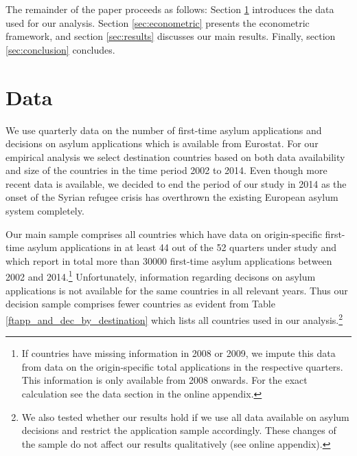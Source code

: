 \documentclass[a4paper,12pt]{article}
\begin{document}

The remainder of the paper proceeds as follows: Section \ref{sec:data} introduces the data used for our analysis. Section \ref{sec:econometric} presents the econometric framework, and section \ref{sec:results} discusses our main results. Finally, section \ref{sec:conclusion} concludes.

\section{Data} \label{sec:data}

We use quarterly data on the number of first-time asylum applications and decisions on asylum applications which is available from Eurostat. For our empirical analysis we select destination countries based on both data availability and size of the countries in the time period 2002 to 2014. Even though more recent data is available, we decided to end the period of our study in 2014 as the onset of the Syrian refugee crisis has overthrown the existing European asylum system completely.  

Our main sample comprises all countries which have data on origin-specific first-time asylum applications in at least 44 out of the 52 quarters under study and which report in total more than 30000 first-time asylum applications between 2002 and 2014.\footnote{If countries have missing information in 2008 or 2009, we impute this data from data on the origin-specific total applications in the respective quarters. This information is only available from 2008 onwards. For the exact calculation see the data section in the online appendix.} Unfortunately, information regarding decisons on asylum applications is not available for the same countries in all relevant years. Thus our decision sample comprises fewer countries as evident from Table \ref{ftapp_and_dec_by_destination} which lists all countries used in our analysis.\footnote{We also tested whether our results hold if we use all data available on asylum decisions and restrict the application sample accordingly. These changes of the sample do not affect our results qualitatively (see  online appendix).}


\end{document}

